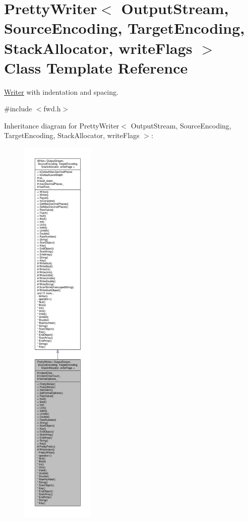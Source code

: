 \hypertarget{classPrettyWriter}{}\section{Pretty\+Writer$<$ Output\+Stream, Source\+Encoding, Target\+Encoding, Stack\+Allocator, write\+Flags $>$ Class Template Reference}
\label{classPrettyWriter}


\hyperlink{classWriter}{Writer} with indentation and spacing.  




{\ttfamily \#include $<$fwd.\+h$>$}



Inheritance diagram for Pretty\+Writer$<$ Output\+Stream, Source\+Encoding, Target\+Encoding, Stack\+Allocator, write\+Flags $>$\+:
\nopagebreak
\begin{figure}[H]
\begin{center}
\leavevmode
\includegraphics[height=550pt]{classPrettyWriter__inherit__graph}
\end{center}
\end{figure}


